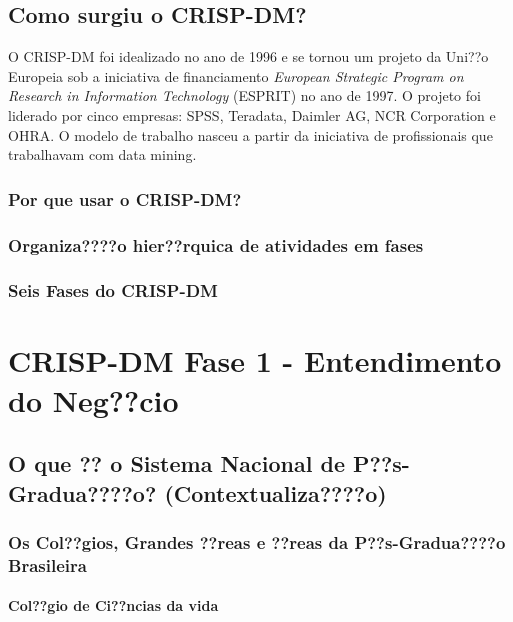 \documentclass[]{article}
\let\oldparagraph\paragraph
\renewcommand{\paragraph}[1]{\oldparagraph{#1}\mbox{}}
\begin{document}
\subsection{Como surgiu o CRISP-DM?}\label{como-surgiu-o-crisp-dm}

O CRISP-DM foi idealizado no ano de 1996 e se tornou um projeto da
Uni??o Europeia sob a iniciativa de financiamento \emph{European
Strategic Program on Research in Information Technology} (ESPRIT) no ano
de 1997. O projeto foi liderado por cinco empresas: SPSS, Teradata,
Daimler AG, NCR Corporation e OHRA. O modelo de trabalho nasceu a partir
da iniciativa de profissionais que trabalhavam com data mining.

\subsubsection{Por que usar o CRISP-DM?}\label{por-que-usar-o-crisp-dm}

\subsubsection{Organiza????o hier??rquica de atividades em
fases}\label{organizao-hierrquica-de-atividades-em-fases}

\subsubsection{Seis Fases do CRISP-DM}\label{seis-fases-do-crisp-dm}

\section{CRISP-DM Fase 1 - Entendimento do
Neg??cio}\label{crisp-dm-fase-1---entendimento-do-negcio}

\subsection{O que ?? o Sistema Nacional de P??s-Gradua????o?
(Contextualiza????o)}\label{o-que-o-sistema-nacional-de-ps-graduao-contextualizao}

\subsubsection{Os Col??gios, Grandes ??reas e ??reas da P??s-Gradua????o
Brasileira}\label{os-colgios-grandes-reas-e-reas-da-ps-graduao-brasileira}

\paragraph{Col??gio de Ci??ncias da
vida}\label{colgio-de-cincias-da-vida}
\end{document}
